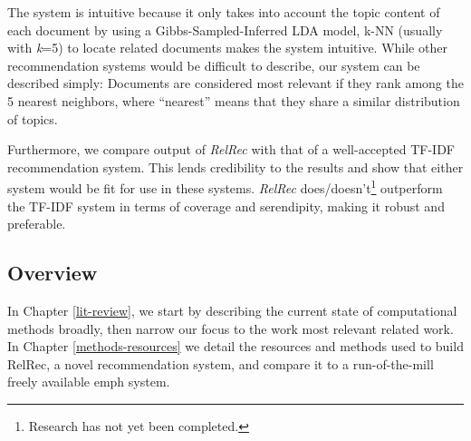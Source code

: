 The system is intuitive because it only takes into account the topic content of each document by using a Gibbs-Sampled-Inferred LDA model, k-NN (usually with \textit{k}=5) to locate related documents makes the system intuitive. While other recommendation systems would be difficult to describe, our system can be described simply: Documents are considered most relevant if they rank among the 5 nearest neighbors, where ``nearest'' means that they share a similar distribution of topics. %


Furthermore, we compare output of \textit{RelRec} with that of a well-accepted TF-IDF recommendation system. This lends credibility to the results and show that either system would be fit for use in these systems. \textit{RelRec} does/doesn't\footnote{Research has not yet been completed.} outperform the TF-IDF system in terms of coverage and serendipity, making it robust and preferable. %



\subsection {Overview}
In Chapter \ref{lit-review}, we start by describing the current state of computational methods broadly, then narrow our focus to the work most relevant related work. In Chapter \ref{methods-resources} we detail the resources and methods used to build RelRec, a novel recommendation system, and compare it to a run-of-the-mill freely available emph system.



